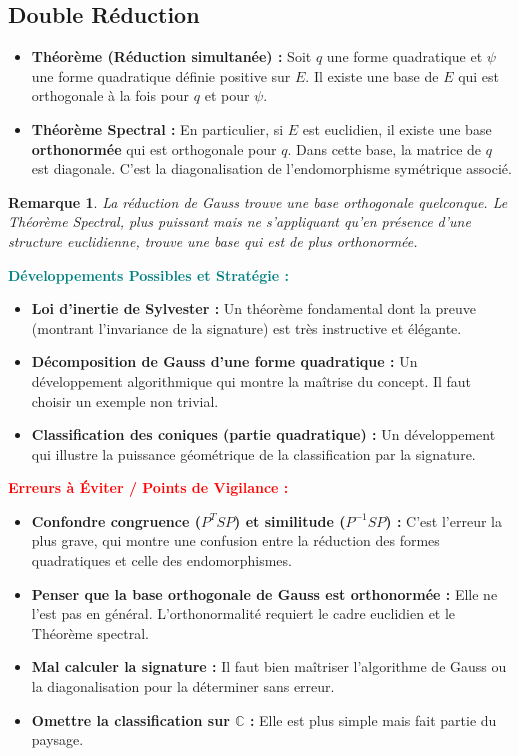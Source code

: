 \documentclass[12pt, a4paper, parskip=full]{report}
\theoremstyle{agregstyle}
\newtheorem{remark}[definition]{Remarque}
\newenvironment{developpements}
  {\par\medskip\noindent\begin{oframed}\noindent\textbf{\textcolor{teal}{Développements Possibles et Stratégie :}}}
  {\end{oframed}\par\medskip}
\newenvironment{erreurs}
  {\par\medskip\noindent\begin{oframed}\noindent\textbf{\textcolor{red}{Erreurs à Éviter / Points de Vigilance :}}}
  {\end{oframed}\par\medskip}
\begin{document}
\subsection{Double Réduction}
\begin{itemize}
    \item \textbf{Théorème (Réduction simultanée) :} Soit $q$ une forme quadratique et $\psi$ une forme quadratique définie positive sur $E$. Il existe une base de $E$ qui est orthogonale à la fois pour $q$ et pour $\psi$.
    \item \textbf{Théorème Spectral :} En particulier, si $E$ est euclidien, il existe une base \textbf{orthonormée} qui est orthogonale pour $q$. Dans cette base, la matrice de $q$ est diagonale. C'est la diagonalisation de l'endomorphisme symétrique associé.
\end{itemize}
\begin{remark}
    La réduction de Gauss trouve une base orthogonale quelconque. Le Théorème Spectral, plus puissant mais ne s'appliquant qu'en présence d'une structure euclidienne, trouve une base qui est de plus orthonormée.
\end{remark}

\begin{developpements}
    \begin{itemize}
        \item \textbf{Loi d'inertie de Sylvester :} Un théorème fondamental dont la preuve (montrant l'invariance de la signature) est très instructive et élégante.
        \item \textbf{Décomposition de Gauss d'une forme quadratique :} Un développement algorithmique qui montre la maîtrise du concept. Il faut choisir un exemple non trivial.
        \item \textbf{Classification des coniques (partie quadratique) :} Un développement qui illustre la puissance géométrique de la classification par la signature.
    \end{itemize}
\end{developpements}

\begin{erreurs}
    \begin{itemize}
        \item \textbf{Confondre congruence ($P^T S P$) et similitude ($P^{-1}SP$) :} C'est l'erreur la plus grave, qui montre une confusion entre la réduction des formes quadratiques et celle des endomorphismes.
        \item \textbf{Penser que la base orthogonale de Gauss est orthonormée :} Elle ne l'est pas en général. L'orthonormalité requiert le cadre euclidien et le Théorème spectral.
        \item \textbf{Mal calculer la signature :} Il faut bien maîtriser l'algorithme de Gauss ou la diagonalisation pour la déterminer sans erreur.
        \item \textbf{Omettre la classification sur $\mathbb{C}$ :} Elle est plus simple mais fait partie du paysage.
    \end{itemize}
\end{erreurs}
\end{document}

